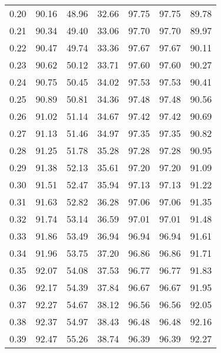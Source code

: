 \begin{tabular}{|c|c|c|c|c|c|c|}
      0.20 &     90.16 &     48.96 &      32.66 &   97.75 &      97.75 &         89.78 \\
      0.21 &     90.34 &     49.40 &      33.06 &   97.70 &      97.70 &         89.97 \\
      0.22 &     90.47 &     49.74 &      33.36 &   97.67 &      97.67 &         90.11 \\
      0.23 &     90.62 &     50.12 &      33.71 &   97.60 &      97.60 &         90.27 \\
      0.24 &     90.75 &     50.45 &      34.02 &   97.53 &      97.53 &         90.41 \\
      0.25 &     90.89 &     50.81 &      34.36 &   97.48 &      97.48 &         90.56 \\
      0.26 &     91.02 &     51.14 &      34.67 &   97.42 &      97.42 &         90.69 \\
      0.27 &     91.13 &     51.46 &      34.97 &   97.35 &      97.35 &         90.82 \\
      0.28 &     91.25 &     51.78 &      35.28 &   97.28 &      97.28 &         90.95 \\
      0.29 &     91.38 &     52.13 &      35.61 &   97.20 &      97.20 &         91.09 \\
      0.30 &     91.51 &     52.47 &      35.94 &   97.13 &      97.13 &         91.22 \\
      0.31 &     91.63 &     52.82 &      36.28 &   97.06 &      97.06 &         91.35 \\
      0.32 &     91.74 &     53.14 &      36.59 &   97.01 &      97.01 &         91.48 \\
      0.33 &     91.86 &     53.49 &      36.94 &   96.94 &      96.94 &         91.61 \\
      0.34 &     91.96 &     53.75 &      37.20 &   96.86 &      96.86 &         91.71 \\
      0.35 &     92.07 &     54.08 &      37.53 &   96.77 &      96.77 &         91.83 \\
      0.36 &     92.17 &     54.39 &      37.84 &   96.67 &      96.67 &         91.95 \\
      0.37 &     92.27 &     54.67 &      38.12 &   96.56 &      96.56 &         92.05 \\
      0.38 &     92.37 &     54.97 &      38.43 &   96.48 &      96.48 &         92.16 \\
      0.39 &     92.47 &     55.26 &      38.74 &   96.39 &      96.39 &         92.27 \\

\end{tabular}
